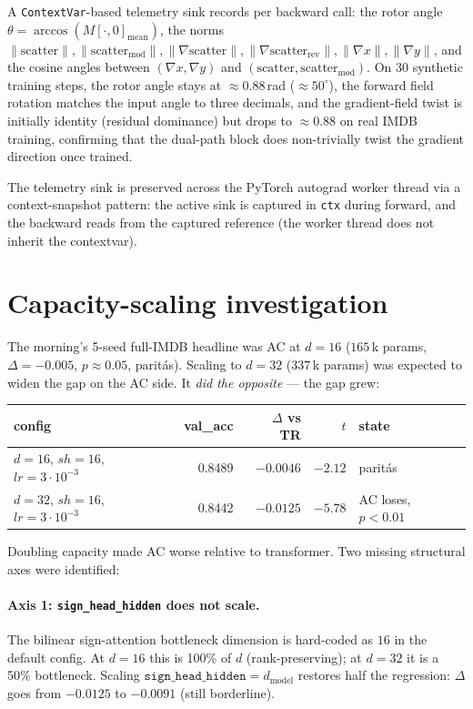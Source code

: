 \documentclass[10pt,a4paper]{article}
\begin{document}
A \texttt{ContextVar}-based telemetry sink records per backward call:
the rotor angle $\theta = \arccos(M[\cdot, 0]_{\text{mean}})$, the
norms $\|\mathrm{scatter}\|, \|\mathrm{scatter}_{\text{mod}}\|,
\|\nabla\mathrm{scatter}\|, \|\nabla\mathrm{scatter}_{\text{rev}}\|,
\|\nabla x\|, \|\nabla y\|$, and the cosine angles between
$(\nabla x, \nabla y)$ and $(\mathrm{scatter}, \mathrm{scatter}_{\text{mod}})$.
On 30 synthetic training steps, the rotor angle stays at
$\approx 0.88$\,rad ($\approx 50^\circ$), the forward field rotation
matches the input angle to three decimals, and the gradient-field
twist is initially identity (residual dominance) but drops to $\approx 0.88$
on real IMDB training, confirming that the dual-path block does
non-trivially twist the gradient direction once trained.

The telemetry sink is preserved across the PyTorch autograd worker
thread via a context-snapshot pattern: the active sink is captured in
\texttt{ctx} during forward, and the backward reads from the captured
reference (the worker thread does not inherit the contextvar).

\section{Capacity-scaling investigation}
\label{sec:capacity}

The morning's 5-seed full-IMDB headline was AC at $d=16$
($165\,$k params, $\Delta = -0.005$, $p \approx 0.05$, paritás).
Scaling to $d=32$ ($337\,$k params) was expected to widen the
gap on the AC side. It \emph{did the opposite} --- the gap grew:

\begin{center}
\begin{tabular}{lrrrl}
\toprule
config & val\_acc & $\Delta$ vs TR & $t$ & state \\
\midrule
$d=16$, $sh=16$, $lr=3 \cdot 10^{-3}$ & 0.8489 & $-0.0046$ & $-2.12$ & paritás \\
$d=32$, $sh=16$, $lr=3 \cdot 10^{-3}$ & 0.8442 & $-0.0125$ & $-5.78$ & AC loses, $p < 0.01$ \\
\bottomrule
\end{tabular}
\end{center}

Doubling capacity made AC worse relative to transformer. Two missing
structural axes were identified:

\paragraph{Axis 1: \texttt{sign\_head\_hidden} does not scale.}
The bilinear sign-attention bottleneck dimension is hard-coded as
$16$ in the default config. At $d=16$ this is 100\% of $d$
(rank-preserving); at $d=32$ it is a 50\% bottleneck. Scaling
$\texttt{sign\_head\_hidden} = d_{\text{model}}$ restores half the
regression: $\Delta$ goes from $-0.0125$ to $-0.0091$ (still borderline).
\end{document}
